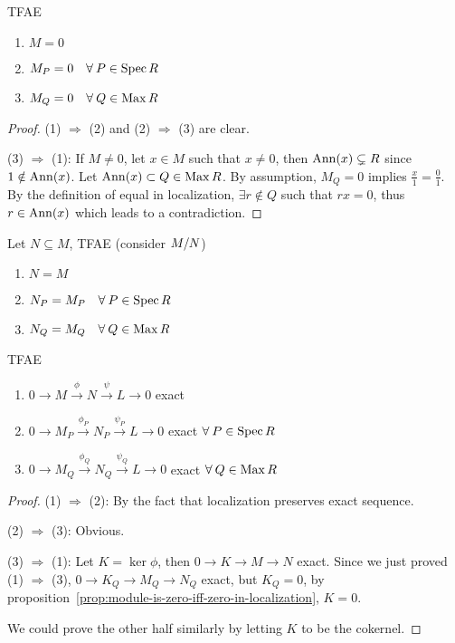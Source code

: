 \begin{prop} \label{prop:module-is-zero-iff-zero-in-localization}
  TFAE
  \begin{enumerate}[(1)]
    \item $M = 0$
    \item $M_P = 0 \quad \forall P \in \Spec R$
    \item $M_Q = 0 \quad \forall Q \in \Max R$
  \end{enumerate}
  \begin{proof}
    (1) $\Rightarrow$ (2) and (2) $\Rightarrow$ (3) are clear.

    (3) $\Rightarrow$ (1):
    If $M \neq 0$, let $x \in M$ such that $x \neq 0$,
    then $\operatorname{Ann}(x) \subsetneq R$ since $1 \notin \operatorname{Ann}(x)$.
    Let $\operatorname{Ann}(x) \subset Q \in \operatorname{Max} R$.
    By assumption, $M_Q = 0$ implies $\frac{x}{1} = \frac{0}{1}$.
    By the definition of equal in localization, $\exists r \notin Q$
    such that $rx = 0$, thus $r \in \operatorname{Ann}(x)$ which leads to a contradiction.
  \end{proof}
\end{prop}

\begin{coro} \label{coro:modules-are-equal-iff-equal-in-localization}
  Let $N \subseteq M$, TFAE (consider ${M}/{N}$)
  \begin{enumerate}[(1)]
    \item $N = M$
    \item $N_P = M_P \quad \forall P \in \Spec R$
    \item $N_Q = M_Q \quad \forall Q \in \Max R$
  \end{enumerate}
\end{coro}

\begin{prop} \label{prop:localization-preserves-exactness}
  TFAE
  \begin{enumerate}[(1)]
    \item $0 \to M \xrightarrow{\phi} N \xrightarrow{\psi} L \to 0$ exact
    \item $0 \to M_P \xrightarrow{\phi_P} N_P \xrightarrow{\psi_P} L \to 0$
      exact $\forall P \in \Spec R$
    \item $0 \to M_Q \xrightarrow{\phi_Q} N_Q \xrightarrow{\psi_Q} L \to 0$
      exact $\forall Q \in \Max R$
  \end{enumerate}
  \begin{proof}
    (1) $\Rightarrow$ (2): By the fact that localization preserves exact sequence.

    (2) $\Rightarrow$ (3): Obvious.

    (3) $\Rightarrow$ (1): Let $K = \ker \phi$, then $0 \to K \to M \to N$
    exact. Since we just proved (1) $\Rightarrow$ (3),
    $0 \to K_Q \to M_Q \to N_Q$ exact, but $K_Q = 0$,
    by proposition~\ref{prop:module-is-zero-iff-zero-in-localization},
    $K = 0$.

    We could prove the other half similarly by letting $K$ to be the cokernel.
  \end{proof}
\end{prop}

